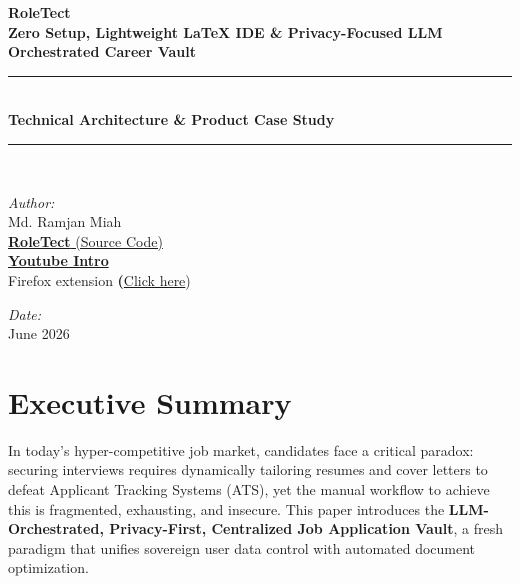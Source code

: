 \documentclass[10pt,a4paper]{article}
\begin{document}

\begin{titlepage}
    \centering
    \vspace*{1.5cm}

    {\Huge \bfseries RoleTect} \\[0.5cm]
    {\large \bfseries Zero Setup, Lightweight \LaTeX{} IDE \& Privacy-Focused LLM Orchestrated Career Vault} \\[1.5cm]

    \rule{\linewidth}{0.5mm} \\[0.6cm]
    {\large \bfseries Technical Architecture \& Product Case Study} \\[0.2cm]
    \rule{\linewidth}{0.5mm} \\[2.5cm]

    \begin{minipage}{0.45\textwidth}
        \begin{flushleft} \large
            \emph{Author:} \\
            Md. Ramjan Miah \\
            \href{https://github.com/AhmedTrooper/RoleTect}{\textbf{RoleTect} (Source Code)} \\
            {\textbf{\href{https://youtu.be/_imINpqe9mo}{Youtube Intro}}} \\
            Firefox extension \textbf(\href{https://addons.mozilla.org/en-US/firefox/addon/roletect-ingest/}{Click here})
        \end{flushleft}
    \end{minipage}
    \begin{minipage}{0.45\textwidth}
        \begin{flushright} \large
            \emph{Date:} \\
            June 2026
        \end{flushright}
    \end{minipage}

    \vfill




\end{titlepage}




\setcounter{page}{1}

\clearpage
\section{Executive Summary}
In today's hyper-competitive job market, candidates face a critical paradox: securing interviews requires dynamically tailoring resumes and cover letters to defeat Applicant Tracking Systems (ATS), yet the manual workflow to achieve this is fragmented, exhausting, and insecure. This paper introduces the \textbf{LLM-Orchestrated, Privacy-First, Centralized Job Application Vault}, a fresh paradigm that unifies sovereign user data control with automated document optimization.
\end{document}
